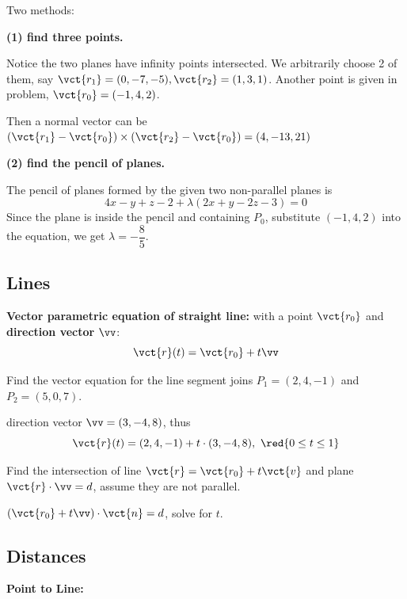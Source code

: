 \begin{spacing}{1.3}
    \sol Two methods: 

    {\bf (1) find three points.} 

    Notice the two planes have infinity points intersected. 
    We arbitrarily choose 2 of them, say 
    $\vct{r_1}=(0,-7,-5), \vct{r_2}=(1,3,1)$. Another point is given in problem,
    $\vct{r_0}=(-1,4,2)$.

    Then a normal vector can be 
    $(\vct{r_1}-\vct{r_0})\times (\vct{r_2}-\vct{r_0})=(4,-13,21)$

    {\bf (2) find the pencil of planes.}

    The pencil of planes formed by the given two non-parallel planes is 
    $$4x-y+z-2+\lambda(2x+y-2z-3)=0$$
    Since the plane is inside the pencil and containing $P_0$,
    substitute $(-1,4,2)$ into the equation, we get $\lambda=-\dfrac{8}{5}.$

    \subsection{Lines}

    {\bf Vector parametric equation of straight line:} with a point 
    $\vct{r_0}$ and {\bf direction vector }$\vv$: 
    $$\vct{r}(t)=\vct{r_0}+t\vv$$

    \eg Find the vector equation for the line segment joins $P_1=(2,4,-1)$
    and $P_2=(5,0,7)$.

    \sol direction vector $\vv=(3,-4,8)$, thus 
    $$\vct{r}(t)=(2,4,-1)+t\cdot (3,-4,8),\ \red{0\le t\le 1}$$

    \eg Find the intersection of line $\vct{r}=\vct{r_0}+t\vct{v}$ 
    and plane $\vct{r}\cdot \vv=d$, assume they are not parallel.

    \sol $(\vct{r_0}+t\vv)\cdot \vct{n}=d$, solve for $t$.

    \subsection{Distances}

    {\bf Point to Line:} 


\end{spacing}
